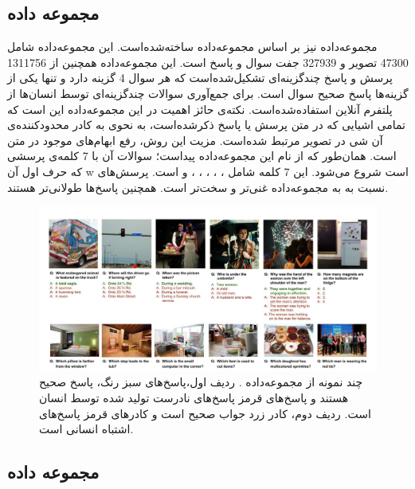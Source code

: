 \subsection{مجموعه داده \cite{zhu2016visual7w}}
	مجموعه‌داده
	نیز بر اساس مجموعه‌داده
 \cite{lin2014microsoft}
	  ساخته‌شده‌است. این مجموعه‌داده شامل 47300 تصویر و 327939 جفت سوال و پاسخ است. این مجموعه‌داده همچنین از 1311756 پرسش و پاسخ چند‌گزینه‌ای تشکیل‌شده‌است که هر سوال 4 گزینه دارد و تنها یکی از گزینه‌ها پاسخ صحیح سوال است. برای جمع‌آوری سوالات چندگزینه‌ای توسط انسان‌ها از پلتفرم آنلاین 
  استفاده‌شده‌است. نکته‌ی حائز اهمیت در این ‌مجموعه‌داده این است که تمامی اشیایی که در متن پرسش یا پاسخ ذکر‌شده‌است، به نحوی به کادر محدود‌کننده‌ی آن شی در تصویر مرتبط شده‌است. مزیت این روش، رفع ابهام‌های موجود در متن است.  همان‌طور که از نام این مجموعه‌داده پیداست؛ سوالات آن با 7 کلمه‌ی پرسشی که حرف اول آن w است شروع می‌شود. این 7 کلمه شامل
  ،
  ،
  ،
  ،
  ،
  و
	است. پرسش‌های
	 نسبت به به مجموعه‌داده 
  غنی‌تر و سخت‌تر است. همچنین پاسخ‌ها طولانی‌تر هستند.
  \begin{figure}[h]
  	\centerline{\includegraphics[scale=0.5]{images/Visual7W.JPG}}
  	\caption{چند نمونه از مجموعه‌داده
  		  \cite{zhu2016visual7w}. 
  		 ردیف اول،پاسخ‌های سبز رنگ، پاسخ صحیح هستند و پاسخ‌های قرمز پاسخ‌های نادرست تولید شده توسط انسان است. ردیف دوم، کادر زرد جواب صحیح است و کادرهای قرمز پاسخ‌های اشتباه انسانی است.}
  	\label{fig:Visual7WExample}
  \end{figure}
  
\subsection{مجموعه داده \cite{johnson2017clevr}}

